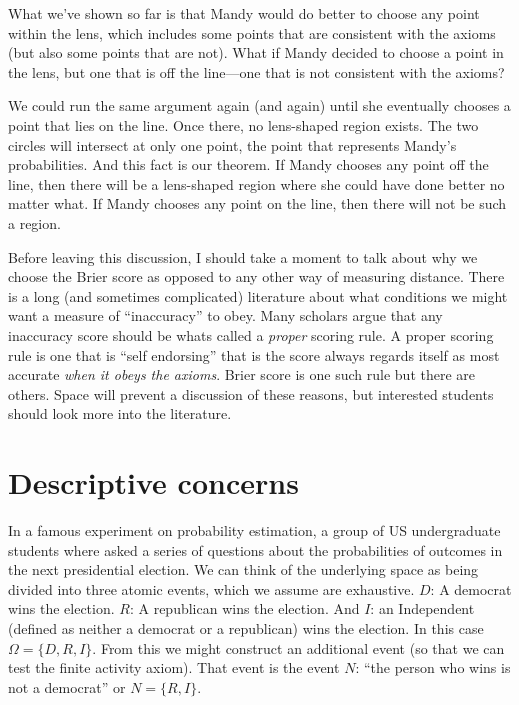 What we've shown so far is that Mandy would do better to choose any point within the lens, which includes some points that are consistent with the axioms (but also some points that are not).  What if Mandy decided to choose a point in the lens, but one that is off the line---one that is not consistent with the axioms?

We could run the same argument again (and again) until she eventually chooses a point that lies on the line. Once there, no lens-shaped region exists.  The two circles will intersect at only one point, the point that represents Mandy's probabilities.  And this fact is our theorem.  If Mandy chooses any point off the line, then there will be a lens-shaped region where she could have done better no matter what.  If Mandy chooses any point on the line, then there will not be such a region. 

Before leaving this discussion, I should take a moment to talk about why we choose the Brier score as opposed to any other way of measuring distance.  There is a long (and sometimes complicated) literature about what conditions we might want a measure of ``inaccuracy'' to obey. Many scholars argue that any inaccuracy score should be whats called a {\it proper} scoring rule.  A proper scoring rule is one that is ``self endorsing'' that is the score always regards itself as most accurate {\it when it obeys the axioms}.  Brier score is one such rule but there are others.  Space will prevent a discussion of these reasons, but interested students should look more into the literature.

\section{Descriptive concerns}


In a famous experiment on probability estimation, a group of US undergraduate students where asked a series of questions about the probabilities of outcomes in the next presidential election.  We can think of the underlying space as being divided into three atomic events, which we assume are exhaustive. $D$: A democrat wins the election. $R$: A republican wins the election. And $I$: an Independent (defined as neither a democrat or a republican) wins the election.  In this case $\Omega = \{D, R, I\}$. From this we might construct an additional event (so that we can test the finite activity axiom).  That event is the event $N$: ``the person who wins is not a democrat'' or $N = \{R, I\}$.

